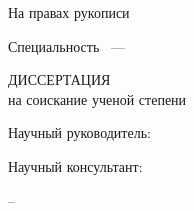 
%
%
%
%

\thispagestyle{empty}

\begin{center}
\dissorg
\par
\end{center}

\vspace{10mm}
\begin{flushright}
На правах рукописи

{\sl \dissudk}
\end{flushright}

\vspace{20mm}
\begin{center}
{\bf \large \dissauthor}
\end{center}

\vspace{5mm}
\begin{center}
{\bf \large \disstitle
\par}

\vspace{10mm}
{%
Специальность \specnum~---

\specname
}

\vspace{10mm}
ДИССЕРТАЦИЯ \\ на соискание ученой степени \\

\edudegree
\end{center}

\vspace{5mm}
\begin{flushright}
Научный руководитель:

\mentordegree

\mentorname
\end{flushright}

\begin{flushright}
Научный консультант:

\consultantdegree

\consultantname

\end{flushright}

\vfill
\begin{center}
{\disscity -- \dissyear}
\end{center}

